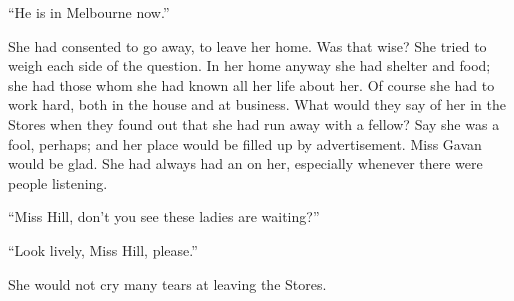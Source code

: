 \documentclass{fiche}
\begin{document}
\begin{texte}
``He is in Melbourne now.''

She had consented to go away, to leave her home. Was that wise? She tried to weigh each side
of the question. In her home anyway she had shelter and food; she had those whom she had known
all her life about her. Of course she had to work hard, both in the house and at business.
What would they say of her in the Stores when they found out that she had run away with a
fellow? Say she was a fool, perhaps; and her place would be filled up by advertisement. Miss
Gavan would be glad. She had always had an  on her, especially whenever there were people listening.

``Miss Hill, don't you see these ladies are waiting?''

``Look lively, Miss Hill, please.''

She would not cry many tears at leaving the Stores.
\end{texte}

\end{document}

